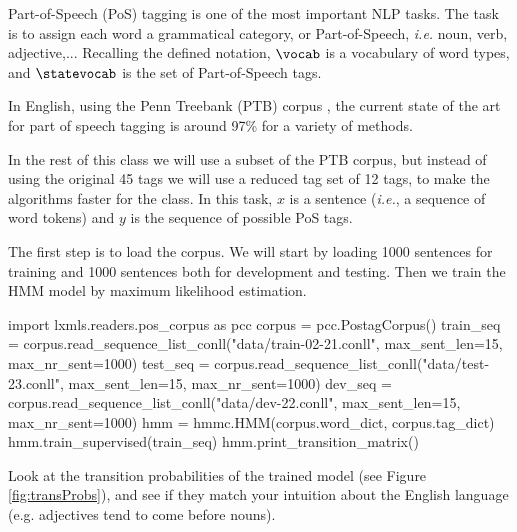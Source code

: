 Part-of-Speech (PoS) tagging is one of the most important NLP tasks. The
task is to assign each word a grammatical category, or Part-of-Speech, \emph{i.e.} noun,
verb, adjective,... Recalling the defined notation, $\vocab$ is a 
vocabulary of word types, and 
$\statevocab$ is the set of Part-of-Speech tags.

In English, using the Penn Treebank (PTB) corpus \citep{pennTreeBank}, the current
state of the art for part of speech tagging is around 97\% for a
variety of methods.

In the rest of this class we will use a subset of the PTB corpus, but
instead of using the original 45 tags we will use a reduced tag set of
12 tags, to make the algorithms faster for the
class. In this task, $x$ is a sentence (\emph{i.e.}, a sequence of word tokens) and $y$
is the sequence of possible PoS tags.

The first step is to load the corpus. We will start by loading
1000 sentences for training and 1000 sentences both for development and
testing. Then we train the HMM model by maximum likelihood estimation.
\begin{python}
import lxmls.readers.pos_corpus as pcc
corpus = pcc.PostagCorpus()
train_seq = corpus.read_sequence_list_conll("data/train-02-21.conll", max_sent_len=15, max_nr_sent=1000)
test_seq = corpus.read_sequence_list_conll("data/test-23.conll", max_sent_len=15, max_nr_sent=1000)
dev_seq = corpus.read_sequence_list_conll("data/dev-22.conll", max_sent_len=15, max_nr_sent=1000)
hmm = hmmc.HMM(corpus.word_dict, corpus.tag_dict)
hmm.train_supervised(train_seq)
hmm.print_transition_matrix()
\end{python}


Look at the transition probabilities of the trained model
 (see
Figure \ref{fig:transProbs}), and see if they match your intuition
about the English language (e.g. adjectives tend to come before nouns).

